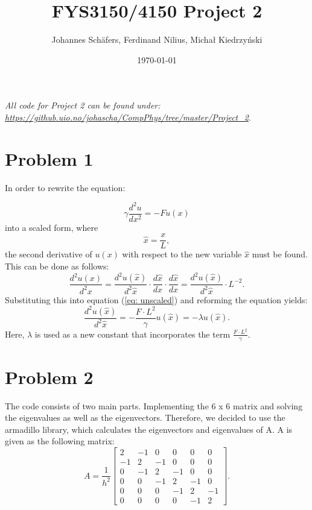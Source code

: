 \documentclass[english,notitlepage]{revtex4-1}  %
\begin{document}
\title{FYS3150/4150 Project 2}      %
\author{Johannes Schäfers, Ferdinand Nilius, Michał Kiedrzyński}          %
\date{\today}                             %
\noaffiliation                            %


\maketitle 
    
\textit{All code for Project 2 can be found under: \url{https://github.uio.no/johascha/CompPhys/tree/master/Project_2}}.
    
\section*{Problem 1}

In order to rewrite the equation: 

\begin{equation} \label{eq: unscaled}
    	\gamma \frac{d^2u}{dx^2} = - F u(x)
\end{equation}
into a scaled form, where 
\begin{equation*}
    	\hat{x} = \frac{x}{L},    
\end{equation*}
the second derivative of $u(x)$ with respect to the new variable $\hat{x}$ must be found. This can be done as follows:
\begin{equation*}
    \frac{d^2u(x)}{d^2x}  =  \frac{d^2u(\hat{x})}{d^2\hat{x}} \cdot \frac{d\hat{x}}{dx} \cdot \frac{d\hat{x}}{dx} = \frac{d^2u(\hat{x})}{d^2\hat{x}} \cdot L^{-2}.
\end{equation*}
Substituting this into equation (\ref{eq: unscaled}) and reforming the equation yields:
\begin{equation*}
    \frac{d^2u(\hat{x})}{d^2\hat{x}}  =  - \frac{F \cdot L^2}{\gamma} u(\hat{x}) = - \lambda u(\hat{x}).
\end{equation*}
Here, $\lambda$ is used as a new constant that incorporates the term $\frac{F \cdot L^2}{\gamma}$.

\section*{Problem 2}
The code consists of two main parts. Implementing the 6 x 6 matrix and solving the eigenvalues as well as the eigenvectors. 
Therefore, we decided to use the armadillo library, which calculates the eigenvectors and eigenvalues of A.
A is given as the following matrix:
\begin{equation}
\label{eq:task2}
A = \frac{1}{h^2} 
\begin{bmatrix} 
 2 & -1 &  0 &  0 &  0 &  0 \\
-1 &  2 & -1 &  0 &  0 &  0 \\
 0 & -1 &  2 & -1 &  0 &  0 \\
 0 &  0 & -1 &  2 & -1 &  0 \\
 0 &  0 &  0 & -1 &  2 & -1 \\
 0 &  0 &  0 &  0 & -1 &  2
\end{bmatrix}.  
\end{equation}
\end{document}
